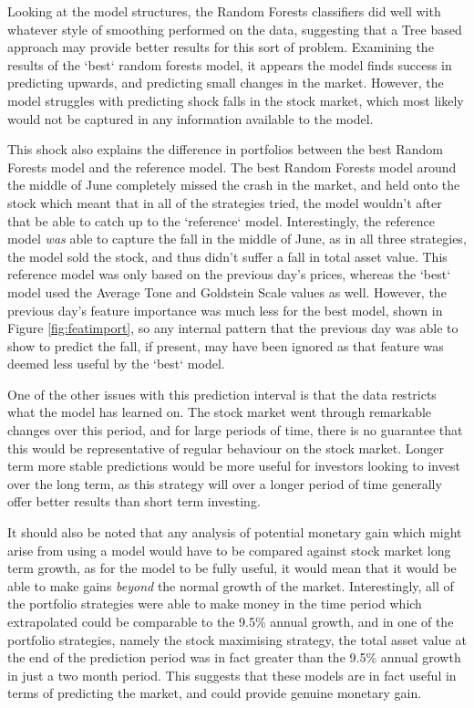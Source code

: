 Looking at the model structures, the Random Forests classifiers did well with whatever style of smoothing performed on the data, suggesting that a Tree based approach may provide better results for this sort of problem. Examining the results of the `best` random forests model, it appears the model finds success in predicting upwards, and predicting small changes in the market. However, the model struggles with predicting shock falls in the stock market, which most likely would not be captured in any information available to the model.  

This shock also explains the difference in portfolios between the best Random Forests model and the reference model. The best Random Forests model around the middle of June completely missed the crash in the market, and held onto the stock which meant that in all of the strategies tried, the model wouldn't after that be able to catch up to the `reference` model. Interestingly, the reference model \textit{was} able to capture the fall in the middle of June, as in all three strategies, the model sold the stock, and thus didn't suffer a fall in total asset value. This reference model was only based on the previous day's prices, whereas the `best` model used the Average Tone and Goldstein Scale values as well. However, the previous day's feature importance was much less for the best model, shown in Figure \ref{fig:featimport}, so any internal pattern that the previous day was able to show to predict the fall, if present, may have been ignored as that feature was deemed less useful by the `best` model. 

One of the other issues with this prediction interval is that the data restricts what the model has learned on. The stock market went through remarkable changes over this period, and for large periods of time, there is no guarantee that this would be representative of regular behaviour on the stock market. Longer term more stable predictions would be more useful for investors looking to invest over the long term, as this strategy will over a longer period of time generally offer better results than short term investing.

It should also be noted that any analysis of potential monetary gain which might arise from using a model would have to be compared against stock market long term growth, as for the model to be fully useful, it would mean that it would be able to make gains \textit{beyond} the normal growth of the market. Interestingly, all of the portfolio strategies were able to make money in the time period which extrapolated could be comparable to the 9.5\% annual growth, and in one of the portfolio strategies, namely the stock maximising strategy, the total asset value at the end of the prediction period was in fact greater than the 9.5\% annual growth in just a two month period. This suggests that these models are in fact useful in terms of predicting the market, and could provide genuine monetary gain. 





